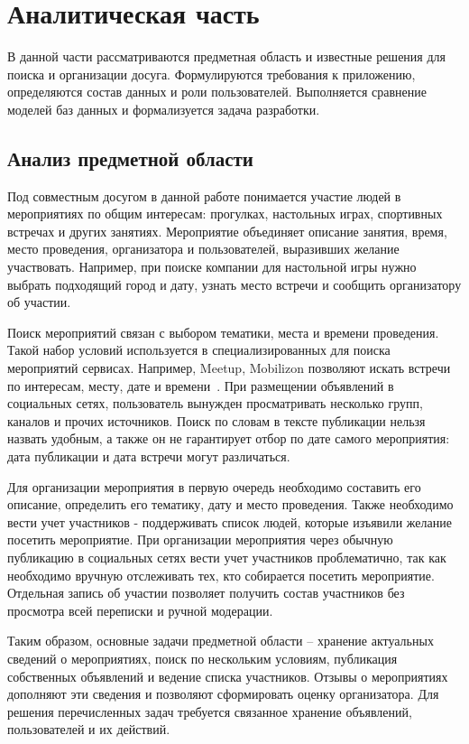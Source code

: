\chapter{Аналитическая часть}

В данной части рассматриваются предметная область и известные решения для поиска и организации досуга. Формулируются требования к приложению, определяются состав данных и роли пользователей. Выполняется сравнение моделей баз данных и формализуется задача разработки.

\section{Анализ предметной области}

Под совместным досугом в данной работе понимается участие людей в мероприятиях по общим интересам: прогулках, настольных играх, спортивных встречах и других занятиях. Мероприятие объединяет описание занятия, время, место проведения, организатора и пользователей, выразивших желание участвовать. Например, при поиске компании для настольной игры нужно выбрать подходящий город и дату, узнать место встречи и сообщить организатору об участии.

Поиск мероприятий связан с выбором тематики, места и времени проведения. Такой набор условий используется в специализированных для поиска мероприятий сервисах. Например, Meetup, Mobilizon позволяют искать встречи по интересам, месту, дате и времени~\cite{meetup}. При размещении объявлений в социальных сетях, пользователь вынужден просматривать несколько групп, каналов и прочих источников. Поиск по словам в тексте публикации нельзя назвать удобным, а также он не гарантирует отбор по дате самого мероприятия: дата публикации и дата встречи могут различаться.

Для организации мероприятия в первую очередь необходимо составить его описание, определить его тематику, дату и место проведения. Также необходимо вести учет участников - поддерживать список людей, которые изъявили желание посетить мероприятие. При организации мероприятия через обычную публикацию в социальных сетях вести учет участников проблематично, так как необходимо вручную отслеживать тех, кто собирается посетить мероприятие. Отдельная запись об участии позволяет получить состав участников без просмотра всей переписки и ручной модерации.

Таким образом, основные задачи предметной области -- хранение актуальных сведений о мероприятиях, поиск по нескольким условиям, публикация собственных объявлений и ведение списка участников. Отзывы о мероприятиях дополняют эти сведения и позволяют сформировать оценку организатора. Для решения перечисленных задач требуется связанное хранение объявлений, пользователей и их действий.

